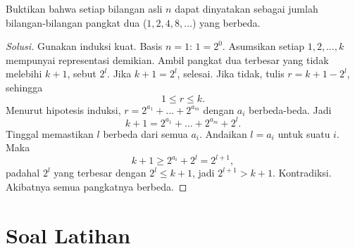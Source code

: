 \documentclass[12pt]{scrartcl}
\begin{document}
\begin{example}
Buktikan bahwa setiap bilangan asli $n$ dapat dinyatakan sebagai jumlah
bilangan-bilangan pangkat dua ($1, 2, 4, 8, \dots$) yang berbeda.
\end{example}
\begin{proof}[Solusi]
Gunakan induksi kuat. Basis $n = 1$: $1 = 2^0$.
Asumsikan setiap $1, 2, \dots, k$ mempunyai representasi demikian.
Ambil pangkat dua terbesar yang tidak melebihi $k+1$, sebut $2^l$.
Jika $k+1 = 2^l$, selesai.
Jika tidak, tulis $r = k+1 - 2^l$, sehingga
\[ 1 \le r \le k. \]
Menurut hipotesis induksi, $r = 2^{a_1} + \dots + 2^{a_m}$
dengan $a_i$ berbeda-beda. Jadi
\[ k + 1 = 2^{a_1} + \dots + 2^{a_m} + 2^l. \]
Tinggal memastikan $l$ berbeda dari semua $a_i$.
Andaikan $l = a_i$ untuk suatu $i$. Maka
\[ k+1 \ge 2^{a_i} + 2^l = 2^{l+1}, \]
padahal $2^l$ yang terbesar dengan $2^l \le k+1$, jadi $2^{l+1} > k+1$.
Kontradiksi. Akibatnya semua pangkatnya berbeda.
\end{proof}

\section{Soal Latihan}
\end{document}
